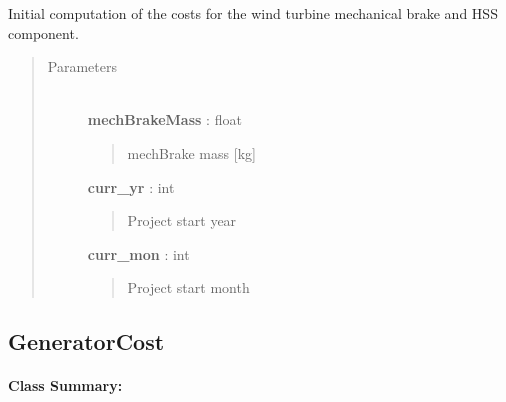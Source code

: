 \documentclass[letterpaper,10pt,openany,oneside]{sphinxmanual}
\begin{document}
\begin{fulllineitems}
\label{documentation:turbine_costSE.src.nacelle_costsSE.HighSpeedShaftCost}
Initial computation of the costs for the wind turbine mechanical brake and HSS component.
\begin{quote}\begin{description}
\item[{Parameters }] \leavevmode\\
\textbf{mechBrakeMass} : float
\begin{quote}

mechBrake mass {[}kg{]}
\end{quote}

\textbf{curr\_yr} : int
\begin{quote}

Project start year
\end{quote}

\textbf{curr\_mon} : int
\begin{quote}

Project start month
\end{quote}

\end{description}\end{quote}

\end{fulllineitems}



\subsection{GeneratorCost}
\label{documentation:generatorcost}\label{documentation:generatorcost-class-label}\paragraph{Class Summary:}
\end{document}
